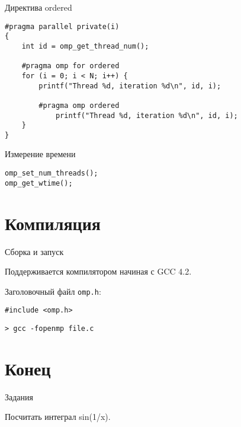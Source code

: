 \begin{frame}[fragile]{Директива ordered}

\begin{lstlisting}
#pragma parallel private(i)
{
    int id = omp_get_thread_num();

    #pragma omp for ordered
    for (i = 0; i < N; i++) {
        printf("Thread %d, iteration %d\n", id, i);

        #pragma omp ordered
            printf("Thread %d, iteration %d\n", id, i);
    }
}
\end{lstlisting}

\end{frame}

\begin{frame}[fragile]{Измерение времени}

\begin{lstlisting}
omp_set_num_threads();
omp_get_wtime();
\end{lstlisting}

\end{frame}

\section{Компиляция}

\begin{frame}[fragile]{Сборка и запуск}

Поддерживается компилятором начиная с GCC 4.2.

Заголовочный файл \texttt{omp.h}:

\begin{lstlisting}
#include <omp.h>
\end{lstlisting}

\begin{lstlisting}
> gcc -fopenmp file.c
\end{lstlisting}

\end{frame}

\section*{Конец}

\begin{frame}{Задания}

Посчитать интеграл sin(1/x).

\end{frame}

